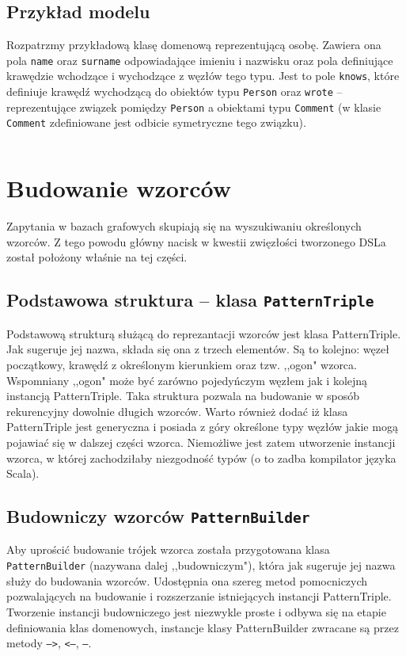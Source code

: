 \documentclass[brudnopis]{xmgr}
\begin{document}
\inputminted{scala}{listings/scala/dsl/simple-relation.scala}

\subsection{Przykład modelu}

Rozpatrzmy przykładową klasę domenową reprezentującą osobę. Zawiera ona pola \texttt{name} oraz \texttt{surname} odpowiadające imieniu i nazwisku oraz pola definiujące krawędzie wchodzące i wychodzące z węzłów tego typu. Jest to pole \texttt{knows}, które definiuje krawędź wychodzącą do obiektów typu \texttt{Person} oraz \texttt{wrote} -- reprezentujące związek pomiędzy \texttt{Person} a obiektami typu \texttt{Comment} (w klasie \texttt{Comment} zdefiniowane jest odbicie symetryczne tego związku).

\inputminted{scala}{listings/scala/dsl/sample-model.scala}

\section{Budowanie wzorców}

Zapytania w bazach grafowych skupiają się na wyszukiwaniu określonych wzorców. Z tego powodu główny nacisk w kwestii zwięzłości tworzonego DSLa został położony właśnie na tej części.

\subsection{Podstawowa struktura -- klasa \texttt{PatternTriple}}
Podstawową strukturą służącą do reprezantacji wzorców jest klasa PatternTriple. Jak sugeruje jej nazwa, składa się ona z trzech elementów. Są to kolejno: węzeł początkowy, krawędź z określonym kierunkiem oraz tzw. ,,ogon" wzorca. Wspomniany ,,ogon" może być zarówno pojedyńczym węzłem jak i kolejną instancją PatternTriple. Taka struktura pozwala na budowanie w sposób rekurencyjny dowolnie długich wzorców. Warto również dodać iż klasa PatternTriple jest generyczna i posiada z góry określone typy węzłów jakie mogą pojawiać się w dalszej części wzorca. Niemożliwe jest zatem utworzenie instancji wzorca, w której zachodziłaby niezgodność typów (o to zadba kompilator języka Scala).

\subsection{Budowniczy wzorców \texttt{PatternBuilder}}
Aby uprościć budowanie trójek wzorca została przygotowana klasa \texttt{PatternBuilder} (nazywana dalej ,,budowniczym"), która jak sugeruje jej nazwa służy do budowania wzorców. Udostępnia ona szereg metod pomocniczych pozwalających na budowanie i rozszerzanie istniejących instancji PatternTriple. Tworzenie instancji budowniczego jest niezwykle proste i odbywa się na etapie definiowania klas domenowych, instancje klasy PatternBuilder zwracane są przez metody \texttt{-->}, \texttt{<--}, \texttt{--}.
\end{document}
